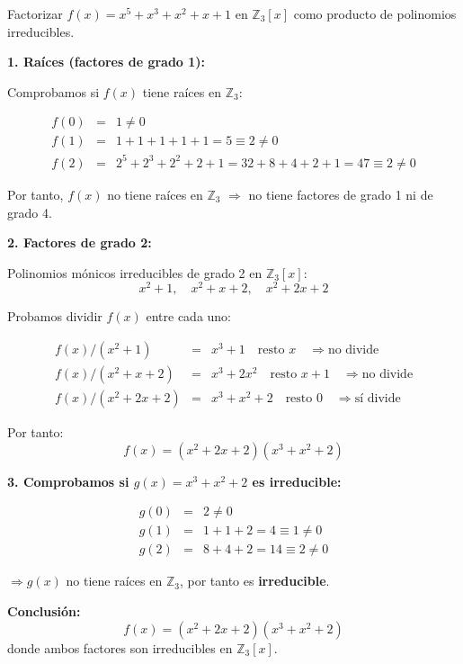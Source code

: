 \documentclass[a4paper,12pt]{article}
\begin{document}
\begin{ejemplo}[title=Ejemplo: Polinomio Reducible]

Factorizar \( f(x) = x^5 + x^3 + x^2 + x + 1 \) en \(\mathbb{Z}_3[x]\) como producto de polinomios irreducibles.

\medskip
\textbf{1. Raíces (factores de grado 1):}

Comprobamos si \(f(x)\) tiene raíces en \(\mathbb{Z}_3\):

\[
\begin{array}{lcl}
f(0) &=& 1 \neq 0 \\
f(1) &=& 1 + 1 + 1 + 1 + 1 = 5 \equiv 2 \neq 0 \\
f(2) &=& 2^5 + 2^3 + 2^2 + 2 + 1 = 32 + 8 + 4 + 2 + 1 = 47 \equiv 2 \neq 0
\end{array}
\]

Por tanto, \(f(x)\) no tiene raíces en \(\mathbb{Z}_3\)  
\(\Rightarrow\) no tiene factores de grado 1 ni de grado 4.

\medskip
\textbf{2. Factores de grado 2:}

Polinomios mónicos irreducibles de grado 2 en \(\mathbb{Z}_3[x]\):
\[
x^2 + 1,\quad x^2 + x + 2,\quad x^2 + 2x + 2
\]

Probamos dividir \(f(x)\) entre cada uno:

\[
\begin{array}{lcl}
f(x) / (x^2 + 1) &=& x^3 + 1 \quad \text{resto } \boxed{x} \quad \Rightarrow \text{no divide} \\[4pt]
f(x) / (x^2 + x + 2) &=& x^3 + 2x^2 \quad \text{resto } \boxed{x + 1} \quad \Rightarrow \text{no divide} \\[4pt]
f(x) / (x^2 + 2x + 2) &=& x^3 + x^2 + 2 \quad \text{resto } \boxed{0} \quad \Rightarrow \text{sí divide}
\end{array}
\]

Por tanto:
\[
f(x) = (x^2 + 2x + 2)(x^3 + x^2 + 2)
\]

\medskip
\textbf{3. Comprobamos si $g(x) = x^3 + x^2 + 2$ es irreducible:}

\[
\begin{array}{lcl}
g(0) &=& 2 \neq 0 \\
g(1) &=& 1 + 1 + 2 = 4 \equiv 1 \neq 0 \\
g(2) &=& 8 + 4 + 2 = 14 \equiv 2 \neq 0
\end{array}
\]

\(\Rightarrow g(x)\) no tiene raíces en \(\mathbb{Z}_3\), por tanto es \textbf{irreducible}.

\medskip
\textbf{Conclusión:}
\[
\boxed{f(x) = (x^2 + 2x + 2)(x^3 + x^2 + 2)}
\]
donde ambos factores son irreducibles en \(\mathbb{Z}_3[x]\).
\end{ejemplo}
\end{document}
